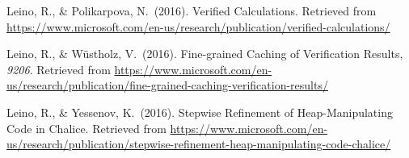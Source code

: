 \documentclass[12pt,twoside]{article}
\begin{document}
{\begin{thebibliography}{222}
\mdbibitemlabel{}Leino, R., \& Polikarpova, N.~(2016). Verified Calculations. Retrieved from \href{https://www.microsoft.com/en-us/research/publication/verified-calculations/}{{\ttfamily https://\hspace{0pt}www.\hspace{0pt}microsoft.\hspace{0pt}com/\hspace{0pt}en-\hspace{0pt}us/\hspace{0pt}research/\hspace{0pt}publication/\hspace{0pt}verified-\hspace{0pt}calculations/\hspace{0pt}}}\label{leino_verified_2016}%

\mdbibitemlabel{}Leino, R., \& Wüstholz, V.~(2016). Fine-grained Caching of Verification Results, \emph{9206}. Retrieved from \href{https://www.microsoft.com/en-us/research/publication/fine-grained-caching-verification-results/}{{\ttfamily https://\hspace{0pt}www.\hspace{0pt}microsoft.\hspace{0pt}com/\hspace{0pt}en-\hspace{0pt}us/\hspace{0pt}research/\hspace{0pt}publication/\hspace{0pt}fine-\hspace{0pt}grained-\hspace{0pt}caching-\hspace{0pt}verification-\hspace{0pt}results/\hspace{0pt}}}\label{leino_fine-grained_2016}%

\mdbibitemlabel{}Leino, R., \& Yessenov, K.~(2016). Stepwise Refinement of Heap-Manipulating Code in Chalice. Retrieved from \href{https://www.microsoft.com/en-us/research/publication/stepwise-refinement-heap-manipulating-code-chalice/}{{\ttfamily https://\hspace{0pt}www.\hspace{0pt}microsoft.\hspace{0pt}com/\hspace{0pt}en-\hspace{0pt}us/\hspace{0pt}research/\hspace{0pt}publication/\hspace{0pt}stepwise-\hspace{0pt}refinement-\hspace{0pt}heap-\hspace{0pt}manipulating-\hspace{0pt}code-\hspace{0pt}chalice/\hspace{0pt}}}\label{leino_stepwise_2016}%


\end{thebibliography}}
\end{document}
